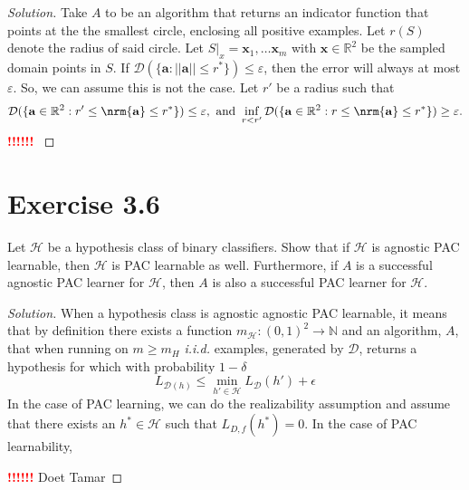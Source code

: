 \documentclass[10pt, a4paper, twoside]{amsart}
\newcommand{\N}{\ensuremath{\mathbb{N}}}
\newcommand{\R}{\ensuremath{\mathbb{R}}}
\DeclarePairedDelimiter{\nrm}\lVert\rVert
\newenvironment{solution}
               {\let\oldqedsymbol=\qedsymbol
                \renewcommand{\qedsymbol}{$\blacktriangleleft$}
                \begin{proof}[Solution]}
               {\end{proof}
                \renewcommand{\qedsymbol}{\oldqedsymbol}}
\newcommand{\TODO}{\textcolor{red}{\textbf{!!!!!! }}}
\begin{document}
\begin{solution}
  Take $A$ to be an algorithm that returns an indicator function that points at the the smallest circle, enclosing all positive examples. Let $r(S)$ denote the radius of said circle.
  Let $S|_x  = \mathbf{x}_1,\ldots \mathbf{x}_m$ with $\mathbf{x} \in \R^2$ be the sampled domain points in $S$. 
  If $\mathcal{D}(\{\mathbf{a}:||\mathbf{a}||\leq r^{*}\}) \leq \varepsilon $, 
  then the error will always at most $\varepsilon$.
  So, we can assume this is not the case.
  Let $r'$ be a radius such that
  \begin{equation*}
    \mathcal{D}(\{\mathbf{a} \in \R^2 : r' \leq \nrm{\mathbf{a}} \leq r^*\}) \leq \varepsilon, \text{ and }
    \inf_{r<r'}\mathcal{D}(\{\mathbf{a} \in \R^2 : r \leq \nrm{\mathbf{a}} \leq r^*\}) \geq \varepsilon.
  \end{equation*}
  \TODO
  
\end{solution}


\section*{Exercise 3.6}
Let $\mathcal{H}$ be a hypothesis class of binary classifiers. Show that if $\mathcal{H}$ is agnostic PAC learnable, then $\mathcal{H}$ is PAC learnable as well.
Furthermore, if $A$ is a successful agnostic PAC learner for $\mathcal{H}$, then $A$ is also a successful PAC learner for $\mathcal{H}$.
\begin{solution}
  When a hypothesis class is agnostic agnostic  PAC learnable, it means that by definition there exists a function $m_{\mathcal{H}}:(0,1)^2\to \N$ and an algorithm, $A$, that when running on $m\geq m_{H}$ \textit{i.i.d.} examples, generated by $\mathcal{D}$, returns a hypothesis for which
  with probability $1-\delta$
  \begin{equation*}
    L_{\mathcal{D}(h)} \leq \min_{h' \in \mathcal{H}}L_{\mathcal{D}}(h')+\epsilon
  \end{equation*}
In the case of PAC learning, we can do the realizability assumption and assume that there exists an $h^* \in \mathcal{H}$ such that $L_{D,f}(h^*) = 0$. In the case of PAC learnability, 
  
    
  \TODO Doet Tamar
\end{solution}
\end{document}
